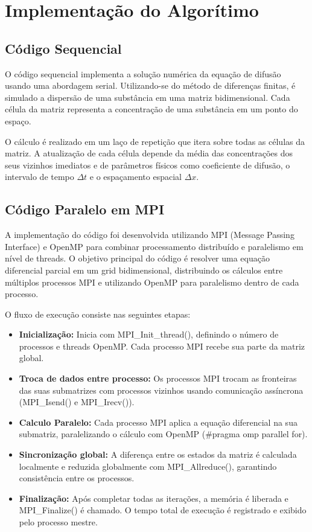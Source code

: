 \documentclass[12pt]{article}
\begin{document}
\section{Implementação do Algorítimo}

\subsection{Código Sequencial}

O código sequencial implementa a solução numérica da equação de difusão usando
uma abordagem serial. Utilizando-se do método de diferenças finitas, é simulado
a dispersão de uma substância em uma matriz bidimensional. Cada célula da
matriz representa a concentração de uma substância em um ponto do espaço.

O cálculo é realizado em um laço de repetição que itera sobre todas as células
da matriz. A atualização de cada célula depende da média das concentrações dos
seus vizinhos imediatos e de parâmetros físicos como coeficiente de difusão, o
intervalo de tempo $\Delta t$ e o espaçamento espacial $\Delta x$.

\subsection{Código Paralelo em MPI}

A implementação do código foi desenvolvida utilizando MPI (Message Passing
Interface) e OpenMP para combinar processamento distribuído e paralelismo em
nível de threads. O objetivo principal do código é resolver uma equação
diferencial parcial em um grid bidimensional, distribuindo os cálculos entre
múltiplos processos MPI e utilizando OpenMP para paralelismo dentro de cada
processo.

O fluxo de execução consiste nas seguintes etapas:

\begin{itemize}
  \item \textbf{Inicialização:} Inicia com MPI\_Init\_thread(), definindo o número de processos e threads OpenMP. Cada processo MPI recebe sua parte da matriz global.
  \item \textbf{Troca de dados entre processo:} Os processos MPI trocam as fronteiras das suas submatrizes com processos vizinhos usando comunicação assíncrona (MPI\_Isend() e MPI\_Irecv()).
  \item \textbf{Calculo Paralelo:} Cada processo MPI aplica a equação diferencial na sua submatriz, paralelizando o cálculo com OpenMP (\#pragma omp parallel for).
  \item \textbf{Sincronização global:} A diferença entre os estados da matriz é calculada localmente e reduzida globalmente com MPI\_Allreduce(), garantindo consistência entre os processos.
  \item \textbf{Finalização:} Após completar todas as iterações, a memória é liberada e MPI\_Finalize() é chamado. O tempo total de execução é registrado e exibido pelo processo mestre.

\end{itemize}
\end{document}
